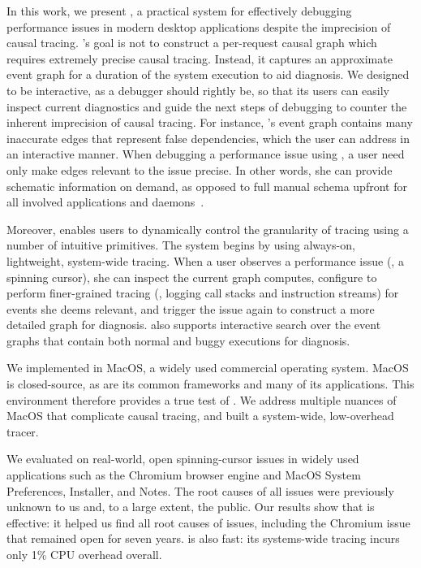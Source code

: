In this work, we present \xxx, a practical system for effectively debugging
performance issues in modern desktop applications despite the imprecision of
causal tracing.  \xxx's goal is not to construct a per-request causal
graph which requires extremely precise causal tracing.  Instead, it
captures an approximate event graph for a duration of the system execution
to aid diagnosis.
We designed \xxx to be interactive, as a debugger should rightly be,
so that its users can easily inspect current diagnostics and guide the next
steps of debugging to counter the inherent imprecision of causal tracing. For
instance, \xxx's event graph contains many inaccurate edges that represent
false dependencies, which the user can address in an interactive manner.
When debugging a performance issue using \xxx, a user need only make edges
relevant to the issue precise.  In other words, she can provide schematic
information on demand, as opposed to full manual schema upfront for all
involved applications and daemons~\cite{barham2004using}.

Moreover, \xxx enables users to dynamically control the granularity of
tracing using a number of intuitive primitives. The system begins by using
always-on, lightweight, system-wide tracing.  When a user observes a
performance issue (\eg, a spinning cursor), she can inspect the current
graph \xxx computes, configure \xxx to perform finer-grained tracing (\eg,
logging call stacks and instruction streams) for events she deems
relevant, and trigger the issue again to construct a more detailed graph for diagnosis.  \xxx also
supports interactive search over the event graphs that contain both normal
and buggy executions for diagnosis.

We implemented \xxx in MacOS, a widely used commercial operating system. MacOS
is closed-source, as are its common frameworks and many of its applications.
This environment therefore provides a true test of \xxx.  We address multiple
nuances of MacOS that complicate causal tracing, and built a system-wide,
low-overhead tracer.

We evaluated \xxx on \nbug real-world, open spinning-cursor issues in
widely used applications such as the Chromium browser engine and MacOS
System Preferences, Installer, and Notes.  The root causes of all \nbug
issues were previously unknown to us and, to a large extent, the
public. Our results show that \xxx is effective: it helped us find all
root causes of issues, including the Chromium issue that remained open for
seven years.  \xxx is also fast: its systems-wide tracing incurs only 1\%
CPU overhead overall.

